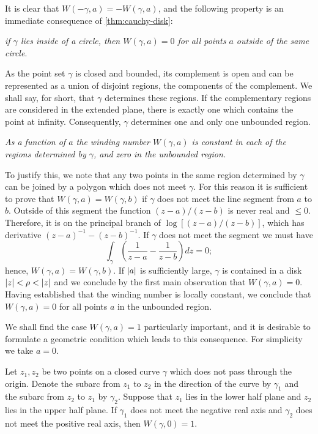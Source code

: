 It is clear that $W(-\gamma, a)=-W(\gamma, a)$, and the following property is an immediate consequence of \ref{thm:cauchy-disk}:

\textit{if $\gamma$ lies inside of a circle, then $W(\gamma,a)=0$ for all points $a$ outside of the same circle}.

As the point set $\gamma$ is closed and bounded, its complement is open and can be represented as a union of disjoint regions, the components of the complement. We shall say, for short, that $\gamma$ determines these regions. If the complementary regions are considered in the extended plane, there is exactly one which contains the point at infinity. Consequently, $\gamma$ determines one and only one unbounded region.

\textit{As a function of $a$ the winding number $W(\gamma, a)$ is constant in each of the regions determined by $\gamma$, and zero in the unbounded region.}

To justify this, we note that any two points in the same region determined by $\gamma$ can be joined by a polygon which does not meet $\gamma$. For this reason it is sufficient to prove that $W(\gamma, a)=W(\gamma,b)$ if $\gamma$ does not meet the line segment from $a$ to $b$. Outside of this segment the function $(z-a)/(z-b)$ is never real and $\le 0$. Therefore, it is on the principal branch of $\log \left[(z-a)/(z-b)\right]$, which has derivative $(z-a)^{-1}-(z-b)^{-1}$. If $\gamma$ does not meet the segment we must have $$\int_{\gamma} \left(\dfrac{1}{z-a}-\dfrac{1}{z-b}\right)dz=0;$$ hence, $W(\gamma, a)=W(\gamma,b)$. If $\lvert a \rvert$ is sufficiently large, $\gamma$ is contained in a disk $\lvert z \rvert<\rho<\lvert z \rvert$ and we conclude by the first main observation that $W(\gamma, a)=0$. Having established that the winding number is locally constant, we conclude that $W(\gamma,a)=0$ for all points $a$ in the unbounded region.

We shall find the case $W(\gamma, a)=1$ particularly important, and it is desirable to formulate a geometric condition which leads to this consequence. For simplicity we take $a=0$.

\begin{lemma}
Let $z_1,z_2$ be two points on a closed curve $\gamma$ which does not pass through the origin. Denote the subarc from $z_1$ to $z_2$ in the direction of the curve by $\gamma_1$ and the subarc from $z_2$ to $z_1$ by $\gamma_2$. Suppose that $z_1$ lies in the lower half plane and $z_2$ lies in the upper half plane. If $\gamma_1$ does not meet the negative real axis and $\gamma_2$ does not meet the positive real axis, then $W(\gamma, 0)=1$.
\end{lemma}

